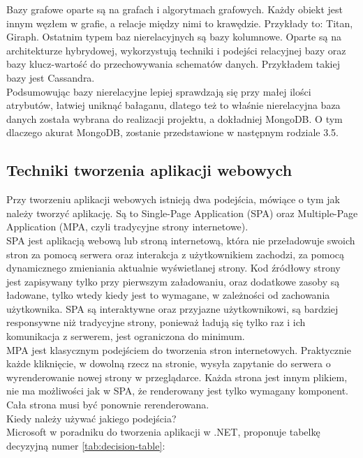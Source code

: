 \documentclass[12pt]{article}
\begin{document}
\begin{sloppypar}
{{    Bazy grafowe oparte są na grafach i algorytmach grafowych. Każdy obiekt jest innym węzłem w grafie, a relacje między nimi to krawędzie. Przykłady to: Titan, Giraph.
    Ostatnim typem baz nierelacyjnych są bazy kolumnowe. Oparte są na architekturze hybrydowej, wykorzystują techniki i podejści relacyjnej bazy oraz bazy klucz-wartość 
    do przechowywania schematów danych. Przykładem takiej bazy jest Cassandra.\\
    Podsumowując bazy nierelacyjne lepiej sprawdzają się przy małej ilości atrybutów, łatwiej uniknąć bałaganu, dlatego też to właśnie nierelacyjna baza danych została wybrana 
    do realizacji projektu, a dokładniej MongoDB. O tym dlaczego akurat MongoDB, zostanie przedstawione w następnym rodziale 3.5.
  }
  \subsection{Techniki tworzenia aplikacji webowych}
  {
    Przy tworzeniu aplikacji webowych istnieją dwa podejścia, mówiące o tym jak należy tworzyć aplikację. 
    Są to Single-Page Application (SPA) oraz Multiple-Page Application (MPA, czyli tradycyjne strony internetowe). \\
    SPA jest aplikacją webową lub stroną internetową, która nie przeładowuje swoich stron za pomocą serwera oraz interakcja z użytkownikiem zachodzi, 
    za pomocą dynamicznego zmieniania aktualnie wyświetlanej strony. Kod źródłowy strony jest zapisywany tylko przy pierwszym załadowaniu, oraz 
    dodatkowe zasoby są ładowane, tylko wtedy kiedy jest to wymagane, w zależności od zachowania użytkownika. 
    SPA są interaktywne oraz przyjazne użytkownikowi, są bardziej responsywne niż tradycyjne strony, ponieważ ładują się tylko raz i ich komunikacja z serwerem,
    jest ograniczona do minimum. \cite{spa-conference} \\
    MPA jest klasycznym podejściem do tworzenia stron internetowych. 
    Praktycznie każde kliknięcie, w dowolną rzecz na stronie, wysyła zapytanie do serwera o wyrenderowanie nowej strony w przeglądarce.
    Każda strona jest innym plikiem, nie ma możliwości jak w SPA, że renderowany jest tylko wymagany komponent. Cała strona musi być ponownie rerenderowana. \\
    Kiedy należy używać jakiego podejścia? \\
    Microsoft w poradniku do tworzenia aplikacji w .NET\cite{mc-spa}, proponuje tabelkę decyzyjną numer \ref{tab:decision-table}:\\
    \begin{center}

\end{center}}}
\end{sloppypar}
\end{document}
